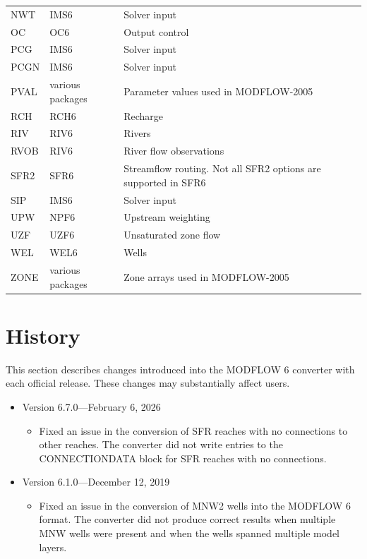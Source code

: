\documentclass[11pt,twoside,twocolumn]{usgsreport}
\begin{document}
\begin{table}[ht]
\begin{tabular*}{\columnwidth}{l l l}
NWT & IMS6 & Solver input \\
OC & OC6 & Output control \\
PCG & IMS6 & Solver input  \\
PCGN & IMS6 & Solver input  \\
PVAL & various packages & Parameter values used in MODFLOW-2005 \\
RCH & RCH6 & Recharge \\
RIV & RIV6 & Rivers \\
RVOB & RIV6 & River flow observations  \\
SFR2 & SFR6 & Streamflow routing. Not all SFR2 options are supported in SFR6  \\
SIP & IMS6 & Solver input  \\
UPW & NPF6 & Upstream weighting \\
UZF & UZF6 & Unsaturated zone flow \\
WEL & WEL6 & Wells \\
ZONE & various packages & Zone arrays used in MODFLOW-2005 \\
\hline 
\end{tabular*}
\label{tab:supportedpackages}
\normalsize
\end{table}


\section{History}
This section describes changes introduced into the MODFLOW 6 converter with each official release.  These changes may substantially affect users.

\begin{itemize}

\item Version 6.7.0---February 6, 2026
\begin{itemize}
  \item Fixed an issue in the conversion of SFR reaches with no connections to other reaches.  The converter did not write entries to the CONNECTIONDATA block for SFR reaches with no connections.
\end{itemize}

\item Version 6.1.0---December 12, 2019
\begin{itemize}
  \item Fixed an issue in the conversion of MNW2 wells into the MODFLOW 6 format.  The converter did not produce correct results when multiple MNW wells were present and when the wells spanned multiple model layers.
\end{itemize}

\end{itemize}

\REFSECTION



\justifying
\vspace*{\fill}
\clearpage
\pagestyle{backofreport}
\makebackcover
\end{document}
